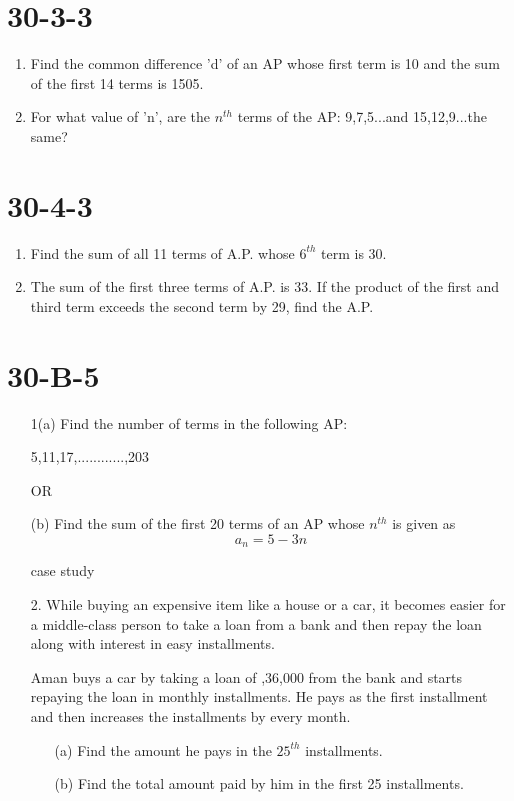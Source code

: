 \documentclass{article}
\begin{document}
\section{30-3-3}
\begin{enumerate}
    \item Find the common difference 'd' of an AP whose first term is 10 and the sum of the first 14 terms is 1505.
    \item For what value of 'n', are the $n^{th}$ terms of the AP: 9,7,5...and 15,12,9...the same?
\end{enumerate}

\section{30-4-3}
\begin{enumerate}
    \item Find the sum of all 11 terms of A.P. whose $6^{th}$ term is 30.
    \item The sum of the first three terms of A.P. is 33. If the product of the first and third term exceeds the second term by 29, find the A.P.
\end{enumerate}
\section{30-B-5}
\begin{enumerate}
    \item[1(a)]Find the number of terms in the following AP:
    \begin{center}
    5,11,17,............,203
\end{center}
\begin{center}
    OR
\end{center}
    \item[(b)] Find the sum of the first 20 terms of an AP whose $n^{th}$ is given as \[a_n= 5 - 3n\]
   \begin{center}

   case study
\end{center}
    \item[2.] While buying an expensive item like a house or a car, it becomes easier for a middle-class person to take a loan from a bank and then repay the loan along with interest in easy installments.\hfill \break
   
Aman buys a car by taking a loan of ,36,000 from the bank and starts repaying the loan in monthly installments. He pays  as the first installment and then increases the installments by  every month.    

 \begin{enumerate}
   
    \item[(a)]Find the amount he pays in the $25^{th}$ installments.
    \item [(b)]Find the total amount paid by him in the first 25 installments.



\end{enumerate}
\end{enumerate}
\end{document}
